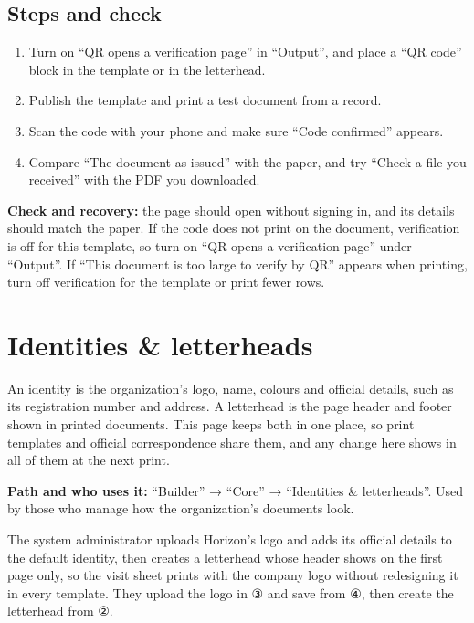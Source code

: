 \subsection{Steps and check}
\begin{enumerate}
\item Turn on “QR opens a verification page” in “Output”, and place a “QR code” block in the template or in the letterhead.
\item Publish the template and print a test document from a record.
\item Scan the code with your phone and make sure “Code confirmed” appears.
\item Compare “The document as issued” with the paper, and try “Check a file you received” with the PDF you downloaded.
\end{enumerate}

\textbf{Check and recovery:} the page should open without signing in, and its details should match the paper. If the code does not print on the document, verification is off for this template, so turn on “QR opens a verification page” under “Output”. If “This document is too large to verify by QR” appears when printing, turn off verification for the template or print fewer rows.

\clearpage
\section{Identities \& letterheads}
\label{sec:builder-feature-identities}

An identity is the organization's logo, name, colours and official details, such as its registration number and address. A letterhead is the page header and footer shown in printed documents. This page keeps both in one place, so print templates and official correspondence share them, and any change here shows in all of them at the next print.

\textbf{Path and who uses it:} “Builder” → “Core” → “Identities \& letterheads”. Used by those who manage how the organization's documents look.

\begin{rcnote}
The system administrator uploads Horizon's logo and adds its official details to the default identity, then creates a letterhead whose header shows on the first page only, so the visit sheet prints with the company logo without redesigning it in every template. They upload the logo in ③ and save from ④, then create the letterhead from ②.
\end{rcnote}

